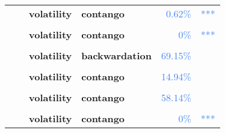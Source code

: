 \documentclass[
  authoryear,
  preprint,
  3p]{elsarticle}
\begin{document}
\begin{longtable}[t]{>{}l>{}l>{}l>{}l>{}r>{}r}
\textbf{} & \textbf{} & \textbf{volatility} & \textbf{contango} & \textcolor[HTML]{4285f4}{0.62\%} & \textcolor[HTML]{4285f4}{***}\\
\addlinespace
\textbf{\cellcolor{gray!10}{}} & \textbf{\cellcolor{gray!10}{crisis}} & \textbf{\cellcolor{gray!10}{mean}} & \textbf{\cellcolor{gray!10}{backwardation}} & \textcolor[HTML]{4285f4}{\cellcolor{gray!10}{49.29\%}} & \textcolor[HTML]{4285f4}{\cellcolor{gray!10}{}}\\
\textbf{} & \textbf{} & \textbf{volatility} & \textbf{contango} & \textcolor[HTML]{4285f4}{0\%} & \textcolor[HTML]{4285f4}{\vphantom{6} ***}\\
\textbf{\cellcolor{gray!10}{}} & \textbf{\cellcolor{gray!10}{post-crisis}} & \textbf{\cellcolor{gray!10}{mean}} & \textbf{\cellcolor{gray!10}{backwardation}} & \textcolor[HTML]{4285f4}{\cellcolor{gray!10}{0.46\%}} & \textcolor[HTML]{4285f4}{\cellcolor{gray!10}{***}}\\
\textbf{} & \textbf{} & \textbf{volatility} & \textbf{backwardation} & \textcolor[HTML]{4285f4}{69.15\%} & \textcolor[HTML]{4285f4}{}\\
\textbf{\cellcolor{gray!10}{Tin-refined (XLME)}} & \textbf{\cellcolor{gray!10}{past}} & \textbf{\cellcolor{gray!10}{mean}} & \textbf{\cellcolor{gray!10}{backwardation}} & \textcolor[HTML]{4285f4}{\cellcolor{gray!10}{5.22\%}} & \textcolor[HTML]{4285f4}{\cellcolor{gray!10}{*}}\\
\addlinespace
\textbf{} & \textbf{} & \textbf{volatility} & \textbf{contango} & \textcolor[HTML]{4285f4}{14.94\%} & \textcolor[HTML]{4285f4}{}\\
\textbf{\cellcolor{gray!10}{}} & \textbf{\cellcolor{gray!10}{financialisation}} & \textbf{\cellcolor{gray!10}{mean}} & \textbf{\cellcolor{gray!10}{backwardation}} & \textcolor[HTML]{4285f4}{\cellcolor{gray!10}{70.17\%}} & \textcolor[HTML]{4285f4}{\cellcolor{gray!10}{}}\\
\textbf{} & \textbf{} & \textbf{volatility} & \textbf{contango} & \textcolor[HTML]{4285f4}{58.14\%} & \textcolor[HTML]{4285f4}{}\\
\textbf{\cellcolor{gray!10}{}} & \textbf{\cellcolor{gray!10}{crisis}} & \textbf{\cellcolor{gray!10}{mean}} & \textbf{\cellcolor{gray!10}{backwardation}} & \textcolor[HTML]{4285f4}{\cellcolor{gray!10}{34.29\%}} & \textcolor[HTML]{4285f4}{\cellcolor{gray!10}{}}\\
\textbf{} & \textbf{} & \textbf{volatility} & \textbf{contango} & \textcolor[HTML]{4285f4}{0\%} & \textcolor[HTML]{4285f4}{\vphantom{5} ***}\\

\end{longtable}
\end{document}
